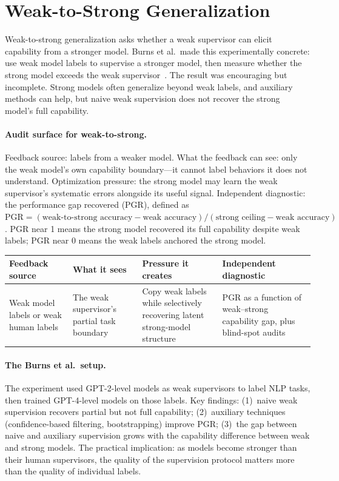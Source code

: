 \section{Weak-to-Strong Generalization}
\label{sec:weak-to-strong}

Weak-to-strong generalization asks whether a weak supervisor can elicit capability from a stronger model. Burns et al.\ made this experimentally concrete: use weak model labels to supervise a stronger model, then measure whether the strong model exceeds the weak supervisor~\cite{burns2023weak}. The result was encouraging but incomplete. Strong models often generalize beyond weak labels, and auxiliary methods can help, but naive weak supervision does not recover the strong model's full capability.

\paragraph{Audit surface for weak-to-strong.} Feedback source: labels from a weaker model. What the feedback can see: only the weak model's own capability boundary---it cannot label behaviors it does not understand. Optimization pressure: the strong model may learn the weak supervisor's systematic errors alongside its useful signal. Independent diagnostic: the performance gap recovered (PGR), defined as $\text{PGR} = (\text{weak-to-strong accuracy} - \text{weak accuracy}) / (\text{strong ceiling} - \text{weak accuracy})$. PGR near 1 means the strong model recovered its full capability despite weak labels; PGR near 0 means the weak labels anchored the strong model.

\begin{center}
\small
\begin{tabularx}{\textwidth}{@{}p{3.2cm}p{3.1cm}p{3.4cm}X@{}}
\toprule
\textbf{Feedback source} & \textbf{What it sees} & \textbf{Pressure it creates} & \textbf{Independent diagnostic} \\
\midrule
Weak model labels or weak human labels & The weak supervisor's partial task boundary & Copy weak labels while selectively recovering latent strong-model structure & PGR as a function of weak--strong capability gap, plus blind-spot audits \\
\bottomrule
\end{tabularx}
\normalsize
\end{center}

\paragraph{The Burns et al.\ setup.} The experiment used GPT-2-level models as weak supervisors to label NLP tasks, then trained GPT-4-level models on those labels. Key findings: (1)~naive weak supervision recovers partial but not full capability; (2)~auxiliary techniques (confidence-based filtering, bootstrapping) improve PGR; (3)~the gap between naive and auxiliary supervision grows with the capability difference between weak and strong models. The practical implication: as models become stronger than their human supervisors, the quality of the supervision protocol matters more than the quality of individual labels.

